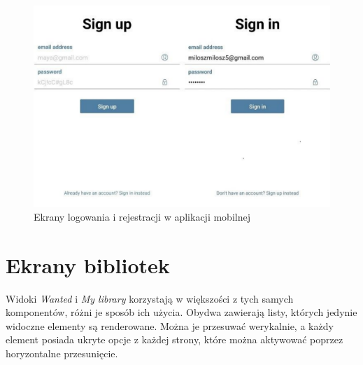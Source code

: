 \begin{figure}[H]
	\centering
	\includegraphics[width=\linewidth]{signin_signup.pdf}
	\caption{Ekrany logowania i rejestracji w aplikacji mobilnej}
\end{figure}
\section{Ekrany bibliotek}
Widoki \textit{Wanted} i \textit{My library} korzystają w większości z tych samych komponentów, różni je sposób ich użycia. Obydwa zawierają listy, których jedynie widoczne elementy są renderowane. Można je przesuwać werykalnie, a każdy element posiada ukryte opcje z każdej strony, które można aktywować poprzez horyzontalne przesunięcie.

